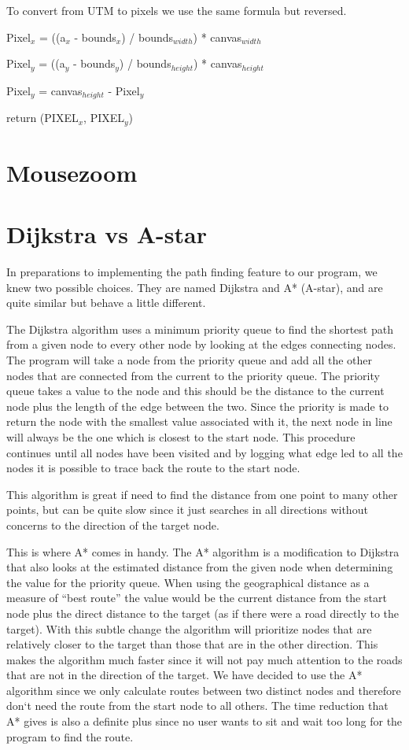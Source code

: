 To convert from UTM to pixels we use the same formula but reversed.

Pixel$_x$ = ((a$_x$ - bounds$_x$) / bounds$_{width}$) * canvas$_{width}$

Pixel$_y$ = ((a$_y$ - bounds$_y$) / bounds$_{height}$) * canvas$_{height}$

Pixel$_y$ = canvas$_{height}$ - Pixel$_y$

return (PIXEL$_x$, PIXEL$_y$)

\section{Mousezoom}
\label{IMPL-MZ}

\section{Dijkstra vs A-star}
\label{IMPL-DVA}
In preparations to implementing the path finding feature to our program, we knew 
two possible choices. They are named Dijkstra and A* (A-star), and are quite 
similar but behave a little different.

The Dijkstra algorithm uses a minimum priority queue to find the shortest path 
from a given node to every other node by looking at the edges connecting nodes. 
The program will take a node from the priority queue and add all the other nodes 
that are connected from the current to the priority queue. The priority queue 
takes a value to the node and this should be the distance to the current node 
plus the length of the edge between the two. Since the priority is made to return 
the node with the smallest value associated with it, the next node in line will 
always be the one which is closest to the start node. This procedure continues 
until all nodes have been visited and by logging what edge led to all the nodes 
it is possible to trace back the route to the start node.

This algorithm is great if need to find the distance from one point to many other 
points, but can be quite slow since it just searches in all directions without 
concerns to the direction of the target node.

This is where A* comes in handy. The A* algorithm is a modification to Dijkstra 
that also looks at the estimated distance from the given node when determining 
the value for the priority queue. When using the geographical distance as a 
measure of ``best route'' the value would be the current distance from the start 
node plus the direct distance to the target (as if there were a road directly to 
the target). With this subtle change the algorithm will prioritize nodes that are 
relatively closer to the target than those that are in the other direction. This 
makes the algorithm much faster since it will not pay much attention to the roads 
that are not in the direction of the target.
We have decided to use the A* algorithm since we only calculate routes between 
two distinct nodes and therefore don`t need the route from the start node to all 
others. The time reduction that A* gives is also a definite plus since no user 
wants to sit and wait too long for the program to find the route.


